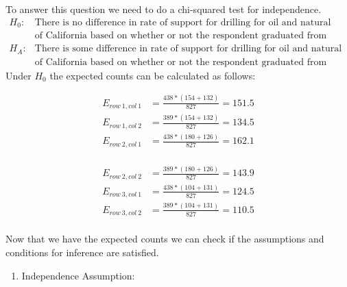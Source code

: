 {
{
To answer this question we need to do a chi-squared test for independence.
\begin{align*}
H_0: &\text{There is no difference in rate of support for drilling for oil and natural gas off the Coast} \\
&\text{of California based on whether or not the respondent graduated from college.} \\
H_A: &\text{There is some difference in rate of support for drilling for oil and natural gas off the Coast} \\
&\text{of California based on whether or not the respondent graduated from college.}
\end{align*}
Under $H_0$ the expected counts can be calculated as follows: \\
\begin{minipage}[c]{0.5\textwidth}
\begin{align*}
E_{row~1, col~1} &= \frac{438 * (154+132)}{827} = 151.5 \\
E_{row~1, col~2} &= \frac{389 * (154+132)}{827} = 134.5 \\
E_{row~2, col~1} &= \frac{438 * (180+126)}{827} = 162.1 \\
\end{align*}
\end{minipage}
\begin{minipage}[c]{0.5\textwidth}
\begin{align*}
E_{row~2, col~2} &= \frac{389 * (180+126)}{827} = 143.9 \\
E_{row~3, col~1} &= \frac{438 * (104+131)}{827}  = 124.5 \\
E_{row~3, col~2} &= \frac{389 * (104+131)}{827}  = 110.5 \\
\end{align*}
\end{minipage}
Now that we have the expected counts we can check if the assumptions and conditions for inference are satisfied.
\begin{enumerate}[1.]
\item Independence Assumption: 
\begin{itemize}

\end{itemize}
\end{enumerate}}}
